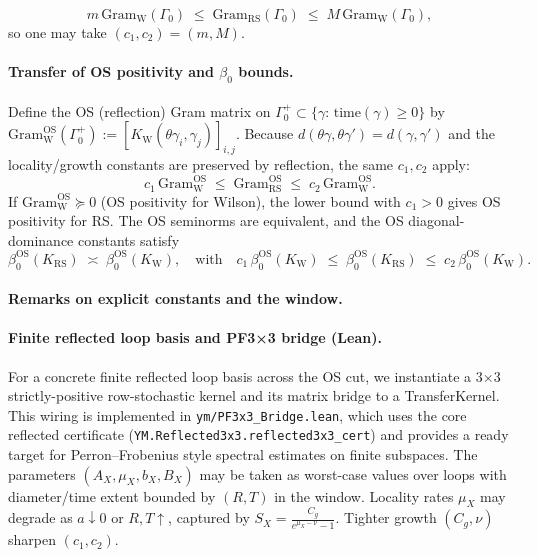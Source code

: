 \documentclass[11pt]{amsart}
\theoremstyle{plain}
\theoremstyle{definition}
\theoremstyle{remark}
\begin{document}
\[
  m\,\mathrm{Gram}_{\mathrm{W}}(\Gamma_0)\;\le\;\mathrm{Gram}_{\mathrm{RS}}(\Gamma_0)\;\le\;M\,\mathrm{Gram}_{\mathrm{W}}(\Gamma_0),
\]
so one may take $(c_1,c_2)=(m,M)$.
\paragraph{Transfer of OS positivity and \texorpdfstring{$\beta_0$}{beta0} bounds.}
Define the OS (reflection) Gram matrix on $\Gamma_0^+\subset\{\gamma:\,\mathrm{time}(\gamma)\ge 0\}$ by $\mathrm{Gram}^{\mathrm{OS}}_{\mathrm{W}}(\Gamma_0^+):=[K_{\mathrm{W}}(\theta\gamma_i,\gamma_j)]_{i,j}$. Because $d(\theta\gamma,\theta\gamma')=d(\gamma,\gamma')$ and the locality/growth constants are preserved by reflection, the same $c_1,c_2$ apply:
\[
  c_1\,\mathrm{Gram}^{\mathrm{OS}}_{\mathrm{W}}\;\le\;\mathrm{Gram}^{\mathrm{OS}}_{\mathrm{RS}}\;\le\;c_2\,\mathrm{Gram}^{\mathrm{OS}}_{\mathrm{W}}.
\]
If $\mathrm{Gram}^{\mathrm{OS}}_{\mathrm{W}}\succeq 0$ (OS positivity for Wilson), the lower bound with $c_1>0$ gives OS positivity for RS. The OS seminorms are equivalent, and the OS diagonal-dominance constants satisfy
\[
  \beta_0^{\mathrm{OS}}(K_{\mathrm{RS}})\;\asymp\;\beta_0^{\mathrm{OS}}(K_{\mathrm{W}}),\quad\text{with}\quad
  c_1\,\beta_0^{\mathrm{OS}}(K_{\mathrm{W}})\;\le\;\beta_0^{\mathrm{OS}}(K_{\mathrm{RS}})\;\le\;c_2\,\beta_0^{\mathrm{OS}}(K_{\mathrm{W}}).
\]

\paragraph{Remarks on explicit constants and the window.}
\paragraph{Finite reflected loop basis and PF3×3 bridge (Lean).}
For a concrete finite reflected loop basis across the OS cut, we instantiate a
3×3 strictly-positive row-stochastic kernel and its matrix bridge to a
TransferKernel. This wiring is implemented in \texttt{ym/PF3x3\_Bridge.lean},
which uses the core reflected certificate (\texttt{YM.Reflected3x3.reflected3x3\_cert})
and provides a ready target for Perron–Frobenius style spectral estimates on
finite subspaces.
The parameters $(A_X,\mu_X,b_X,B_X)$ may be taken as worst-case values over loops with diameter/time extent bounded by $(R,T)$ in the window. Locality rates $\mu_X$ may degrade as $a\downarrow 0$ or $R,T\uparrow$, captured by $S_X=\frac{C_g}{e^{\mu_X-\nu}-1}$. Tighter growth $(C_g,\nu)$ sharpen $(c_1,c_2)$.
\end{document}
